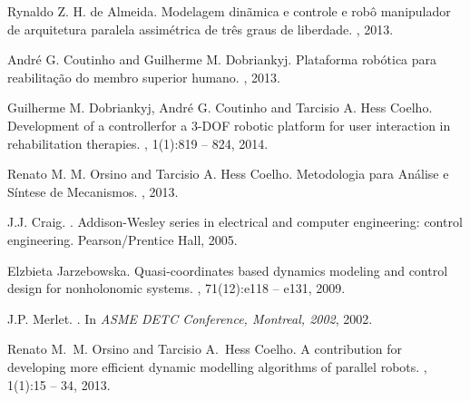 \begin{thebibliography}{10}

Rynaldo Z. H. de Almeida.
\newblock Modelagem din\~amica e controle e rob\^o manipulador
de arquitetura paralela assim\'etrica de tr\^es graus de liberdade.
,
  2013.
  
Andr\'e G. Coutinho and Guilherme M. Dobriankyj.
\newblock Plataforma rob\'otica para reabilita\c{c}\~ao do membro superior humano.
, 2013.

Guilherme M. Dobriankyj, Andr\'e G. Coutinho and Tarcisio A. Hess Coelho.
\newblock Development of a controllerfor a 3-DOF robotic platform for user interaction in rehabilitation therapies.
,
  1(1):819 -- 824, 2014.


Renato M. M. Orsino and Tarcisio A. Hess Coelho.
\newblock Metodologia para An\'alise e S\'intese de Mecanismos.
, 2013.

J.J. Craig.
.
\newblock Addison-Wesley series in electrical and computer engineering: control
  engineering. Pearson/Prentice Hall, 2005.
  
Elzbieta Jarzebowska.
\newblock Quasi-coordinates based dynamics modeling and control design for
  nonholonomic systems.
,
  71(12):e118 -- e131, 2009.

J.P. Merlet.
.
\newblock In {\em ASME DETC Conference, {Montreal, 2002}}, 2002.

Renato M.~M. Orsino and Tarcisio A.~Hess Coelho.
\newblock A contribution for developing more efficient dynamic modelling
  algorithms of parallel robots.
,
  1(1):15 -- 34, 2013.


\end{thebibliography}
